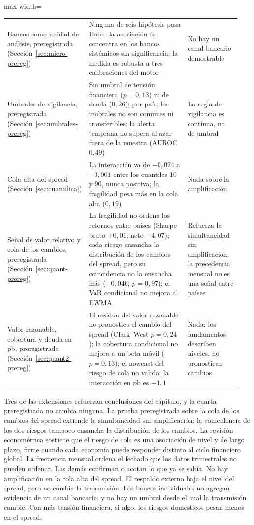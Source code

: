 \begin{table}[htbp]
\begin{adjustbox}{max width=\linewidth}
\begin{tabular}{>{\raggedright\arraybackslash}p{0.24\linewidth}>{\raggedright\arraybackslash}p{0.47\linewidth}>{\raggedright\arraybackslash}p{0.23\linewidth}}
\addlinespace
Bancos como unidad de análisis, preregistrada (Sección~\ref{sec:micro-prereg}) & Ninguna de seis hipótesis pasa Holm; la asociación se concentra en los bancos sistémicos sin significancia; la medida es robusta a tres calibraciones del motor & No hay un canal bancario demostrable \\
\addlinespace
Umbrales de vigilancia, preregistrada (Sección~\ref{sec:umbrales-prereg}) & Sin umbral de tensión financiera ($p=0{,}13$) ni de deuda ($0{,}26$); por país, los umbrales no son comunes ni transferibles; la alerta temprana no supera al azar fuera de la muestra (AUROC $0{,}49$) & La regla de vigilancia es continua, no de umbral \\
\addlinespace
Cola alta del spread (Sección~\ref{sec:cuantilica}) & La interacción va de $-0{,}024$ a $-0{,}001$ entre los cuantiles 10 y 90, nunca positiva; la fragilidad pesa más en la cola alta ($0{,}19$) & Nada sobre la amplificación \\
\addlinespace
Señal de valor relativo y cola de los cambios, preregistrada (Sección~\ref{sec:quant-prereg}) & La fragilidad no ordena los retornos entre países (Sharpe bruto $+0{,}01$; neto $-4{,}07$); cada riesgo ensancha la distribución de los cambios del spread, pero su coincidencia no la ensancha más ($-0{,}046$; $p=0{,}97$); el VaR condicional no mejora al EWMA & Refuerza la simultaneidad sin amplificación; la precedencia mensual no es una señal entre países \\
\addlinespace
Valor razonable, cobertura y deuda en pb, preregistrada (Sección~\ref{sec:quant2-prereg}) & El residuo del valor razonable no pronostica el cambio del spread (Clark--West $p=0{,}24$); la cobertura condicional no mejora a un beta móvil ($p=0{,}13$); el nowcast del riesgo de cola no valida; la interacción en pb es $-1{,}1$ & Nada: los fundamentos describen niveles, no pronostican cambios \\
\bottomrule
\end{tabular}
\end{adjustbox}
\end{table}

Tres de las extensiones refuerzan conclusiones del capítulo, y la cuarta preregistrada no cambia ninguna. La prueba preregistrada sobre la cola de los cambios del spread extiende la simultaneidad sin amplificación: la coincidencia de los dos riesgos tampoco ensancha la distribución de los cambios. La revisión econométrica sostiene que el riesgo de cola es una asociación de nivel y de largo plazo, firme cuando cada economía puede responder distinto al ciclo financiero global. La frecuencia mensual ordena el fechado que los datos trimestrales no pueden ordenar. Las demás confirman o acotan lo que ya se sabía. No hay amplificación en la cola alta del spread. El respaldo externo baja el nivel del spread, pero no cambia la transmisión. Los bancos individuales no agregan evidencia de un canal bancario, y no hay un umbral desde el cual la transmisión cambie. Con más tensión financiera, si algo, los riesgos domésticos pesan menos en el spread.

